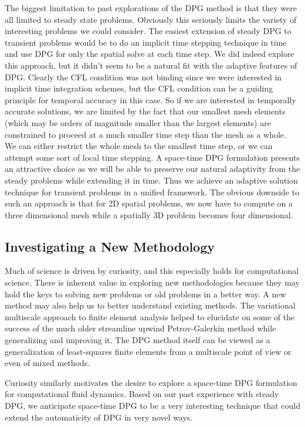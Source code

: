 \documentclass[Dissertation.tex]{subfiles}
\begin{document}
The biggest limitation to past explorations of the DPG method is that they were all limited to steady state problems.
Obviously this seriously limits the variety of interesting problems we could consider.
The easiest extension of steady DPG to transient problems would be to do an implicit time stepping technique in time and use DPG for only the spatial solve at each time step.
We did indeed explore this approach, but it didn't seem to be a natural fit with the adaptive features of DPG.
Clearly the CFL condition was not binding since we were interested in implicit time integration schemes, but the CFL condition can be a guiding principle for temporal accuracy in this case.
So if we are interested in temporally accurate solutions, we are limited by the fact that our smallest mesh elements (which may be orders of magnitude smaller than the largest elements) are constrained to proceed at a much smaller time step than the mesh as a whole.
We can either restrict the whole mesh to the smallest time step, or we can attempt some sort of local time stepping.
A space-time DPG formulation presents an attractive choice as we will be able to preserve our natural adaptivity from the steady problems while extending it in time.
Thus we achieve an adaptive solution technique for transient problems in a unified framework.
The obvious downside to such an approach is that for 2D spatial problems, we now have to compute on a three dimensional mesh while a spatially 3D problem becomes four dimensional.

\subsection{Investigating a New Methodology}
Much of science is driven by curiosity, and this especially holds for computational science.
There is inherent value in exploring new methodologies because they may hold the keys to solving new problems or old problems in a better way.
A new method may also help us to better understand existing methods.
The variational multiscale approach to finite element analysis helped to elucidate on some of the success of the much older streamline upwind Petrov-Galerkin method while generalizing and improving it.
The DPG method itself can be viewed as a generalization of least-squares finite elements
from a multiscale point of view\cite{DPGMultiscale} or even of mixed methods\cite{DPGMixed}.

Curiosity similarly motivates the desire to explore a space-time DPG formulation for computational fluid dynamics.
Based on our past experience with steady DPG, we anticipate space-time DPG to be a very interesting technique that could extend the automaticity of DPG in very novel ways.
\end{document}
